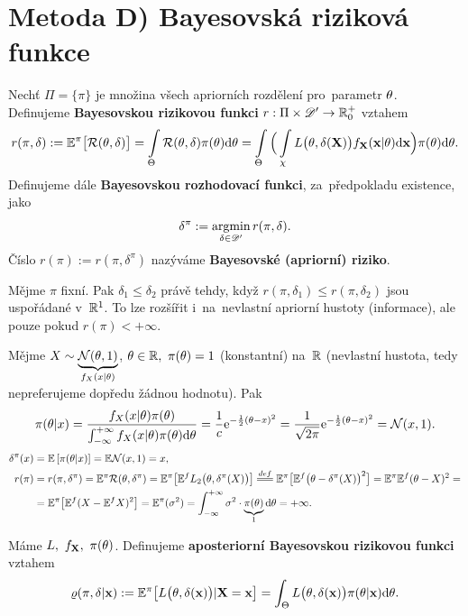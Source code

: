\section{Metoda D) Bayesovská riziková funkce} 
\begin{define}
	Nechť $\Pi=\{ \pi\}$ je množina všech apriorních rozdělení pro~parametr $\theta$. Definujeme \textbf{Bayesovskou rizikovou funkci} $r:\Pi\times\mathscr{D}' \to\mathbb{R}_0^+$ vztahem
	$$ r(\pi,\delta):=\mathbb{E}^\pi\big[ \mathcal{R}(\theta,\delta) \big]=\int\limits_{\Theta}\mathcal{R}(\theta,\delta)\pi(\theta)\mathrm{d}\theta=\int\limits_{\Theta}\Big( \int\limits_{\chi}L\big(\theta,\delta(\textbf{X})\big)f_\textbf{X}(\textbf{x}|\theta)\mathrm{d}\textbf{x} \Big)\pi(\theta)\mathrm{d}\theta.$$
	Definujeme dále \textbf{Bayesovskou rozhodovací funkci}, za~předpokladu existence, jako $$\delta^\pi:=\mathop{\mathrm{argmin}}\limits_{\delta\in\mathscr{D} '}r(\pi,\delta).$$ 
	Číslo $r(\pi):=r(\pi,\delta^\pi)$ nazýváme \textbf{Bayesovské (apriorní) riziko}.  
	
\end{define}
\begin{remark}
	Mějme $\pi$ fixní. Pak $\delta_1\leq\delta_2$ právě tehdy, když $r(\pi,\delta_1)\leq r(\pi,\delta_2)$ jsou uspořádané v~$\mathbb{R}^1$. To lze rozšířit i~na~nevlastní apriorní hustoty (informace), ale pouze pokud $r(\pi)<+\infty$.
\end{remark}
\begin{example}
	Mějme $X\sim\underbrace{\mathcal{N}(\theta,1)}_{f_X(x|\theta)}$, $\theta\in\mathbb{R},~\pi(\theta)=1$ (konstantní) na~$\mathbb{R}$ (nevlastní hustota, tedy nepreferujeme dopředu žádnou hodnotu). Pak
	$$ \pi(\theta|x)=\frac{f_X(x|\theta) \pi(\theta)}{\int_{-\infty}^{+\infty}f_X(x|\theta) \pi(\theta)\mathrm{d}\theta}=\frac{1}{c}\mathrm{e}^{-\frac{1}{2}(\theta-x)^2}=\frac{1}{\sqrt{2\pi}}\mathrm{e}^{-\frac{1}{2}(\theta-x)^2}=\mathcal{N}(x,1).$$
	\[\begin{split}
	\delta^\pi(x)&=\EE{\pi(\t|x)}=\E\NN(x,1)=x,\\
	r(\pi)&= r(\pi,\delta^\pi)=\E^\pi \RF(\t,\delta^\pi)=\E^\pi\big[\E^f L_2\big(\t,\delta^\pi(X)\big)\big]\equal{def}\E^\pi\big[ \E^f\big(\t-\delta^\pi(X) \big)^2 \big]=\E^\pi\E^f(\t-X)^2=\\&=\E^\pi\big[ \E^f(X-\E^fX)^2 \big]=\E^\pi(\sigma^2)=\int_{-\infty}^{+\infty}\sigma^2\cdot \underbrace{\pi(\t)}_{1}\d\t=+\infty.
	\end{split}
	\]
\end{example}
\begin{define}
	Máme $L,~f_{\textbf{X}},~\pi(\theta)$. Definujeme \textbf{aposteriorní Bayesovskou rizikovou funkci} vztahem
	$$ \varrho(\pi,\delta|\textbf{x}):=\mathbb{E}^\pi\big[ L\big(\theta,\delta(\textbf{x})\big)|\textbf{X}=\textbf{x} \big]=\int_\Theta L\big(\theta,\delta(\textbf{x})\big)\pi(\theta|\textbf{x})\mathrm{d}\theta.$$ 
\end{define}

